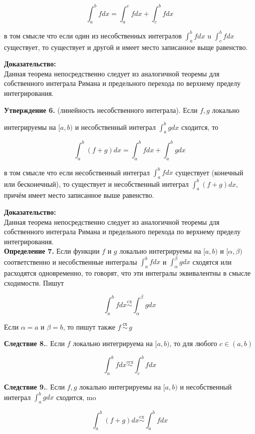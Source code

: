 \documentclass[a4paper,12pt]{article} %
\begin{document}
	$$
	\int_{a}^{b} f d x=\int_{a}^{c} f d x+\int_{c}^{b} f d x
	$$
	
	в том смысле что если один из несобственных интегралов $\int_{a}^{b} f d x$ u $\int_{c}^{b} f d x$ существует, то существует и другой и имеет место записанное выще равенство.
	
	\textbf{Доказательство:\\}
	Данная теорема непосредственно следует из аналогичной теоремы для собственного интеграла Римана и предельного перехода по верхнему пределу интегрирования.
	
	\textbf{Утверждение 6.} (линейность несобственного интеграла). Если $f, g$ локально
	
	интегрируемы на $[a, b)$ и несобственный интеграл $\int_{a}^{b} g d x$ сходится, то
	
	$$
	\int_{a}^{b}(f+g) d x=\int_{a}^{b} f d x+\int_{a}^{b} g d x
	$$
	
	в том смысле что если несобственный интеграл $\int_{a}^{b} f d x$ существует (конечный или бесконечный), то существует и несобственный интеграл $\int_{a}^{b}(f+g) d x$, причём имеет место записанное выше равенство.
	
	\textbf{Доказательство:\\}
	Данная теорема непосредственно следует из аналогичной теоремы для собственного интеграла Римана и предельного перехода по верхнему пределу интегрирования.\\ \textbf{Определение 7.} Если функции $f$ и $g$ локально интегрируемы на $[a, b)$ и $[\alpha, \beta)$ соответственно и несобственные интегралы $\int_{a}^{b} f d x$ и $\int_{\alpha}^{\beta} g d x$ сходятся или расходятся одновременно, то говорят, что эти интегралы эквивалентны в смысле сходимости. Пишут
	
	$$
	\int_{a}^{b} f d x \stackrel{\mathrm{cx}}{\sim} \int_{\alpha}^{\beta} g d x
	$$
	
	Если $\alpha=a$ и $\beta=b$, то пишут также $f \stackrel{\text { сх }}{\sim} g$
	
	\textbf{Следствие 8.}. Если $f$ локально интегрируема на $[a, b)$, то для любого $c \in(a, b)$
	
	$$
	\int_{a}^{b} f d x \stackrel{c \mathrm{cx}}{\sim} \int_{c}^{b} f d x
	$$
	
	\textbf{Следствие 9.}. Если $f, g$ локально интегрируемы на $[a, b)$ и несобственный интеграл $\int_{a}^{b} g d x$ сходится, mo
	
	$$
	\int_{a}^{b}(f+g) d x \stackrel{\mathrm{cx}}{\sim} \int_{a}^{b} f d x
	$$
	
\end{document}
